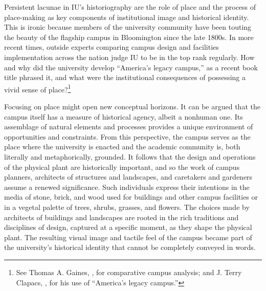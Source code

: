 \documentclass[
  american,
  letterpaper,
]{scrreprt}
\begin{document}
Persistent lacunae in IU's historiography are the role of place and the
process of place-making as key components of institutional image and
historical identity. This is ironic because members of the university
community have been touting the beauty of the flagship campus in
Bloomington since the late 1800s. In more recent times, outside experts
comparing campus design and facilities implementation across the nation
judge IU to be in the top rank regularly. How and why did the university
develop ``America's legacy campus,'' as a recent book title phrased it,
and what were the institutional consequences of possessing a vivid sense
of place?\footnote{See Thomas A. Gaines,
  , for comparative campus analysis; and
  J. Terry Clapacs, , for his use of ``America's legacy campus.''}

Focusing on place might open new conceptual horizons. It can be argued
that the campus itself has a measure of historical agency, albeit a
nonhuman one. Its assemblage of natural elements and processes provides
a unique environment of opportunities and constraints. From this
perspective, the campus serves as the place where the university is
enacted and the academic community is, both literally and
metaphorically, grounded. It follows that the design and operations of
the physical plant are historically important, and so the work of campus
planners, architects of structures and landscapes, and caretakers and
gardeners assume a renewed significance. Such individuals express their
intentions in the media of stone, brick, and wood used for buildings and
other campus facilities or in a vegetal palette of trees, shrubs,
grasses, and flowers. The choices made by architects of buildings and
landscapes are rooted in the rich traditions and disciplines of design,
captured at a specific moment, as they shape the physical plant. The
resulting visual image and tactile feel of the campus became part of the
university's historical identity that cannot be completely conveyed in
words.
\end{document}
